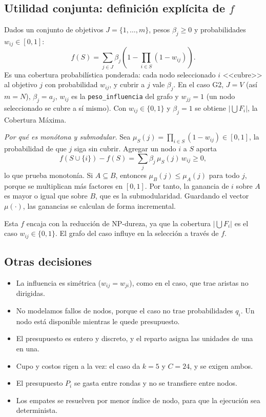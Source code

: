 \documentclass[11pt,a4paper]{article}
\begin{document}
\subsection{Utilidad conjunta: definición explícita de $f$}

Dados un conjunto de objetivos $J=\{1,\dots,m\}$, pesos $\beta_j\ge0$ y
probabilidades $w_{ij}\in[0,1]$:
\[
  f(S)=\sum_{j\in J}\beta_j\left(1-\prod_{i\in S}(1-w_{ij})\right).
\]
Es una cobertura probabilística ponderada: cada nodo seleccionado $i$
<<cubre>> al objetivo $j$ con probabilidad $w_{ij}$, y cubrir a $j$ vale
$\beta_j$. En el caso G2, $J=V$ (así $m=N$), $\beta_j=a_j$, $w_{ij}$ es la
\texttt{peso\_influencia} del grafo y $w_{jj}=1$ (un nodo seleccionado se cubre
a sí mismo). Con $w_{ij}\in\{0,1\}$ y $\beta_j=1$ se obtiene
$\bigl|\bigcup F_i\bigr|$, la Cobertura Máxima.

\emph{Por qué es monótona y submodular.} Sea
$\mu_S(j)=\prod_{i\in S}(1-w_{ij})\in[0,1]$, la probabilidad de que $j$ siga
sin cubrir. Agregar un nodo $i$ a $S$ aporta
\[
  f(S\cup\{i\})-f(S)=\sum_j\beta_j\,\mu_S(j)\,w_{ij}\ge0,
\]
lo que prueba monotonía. Si $A\subseteq B$, entonces $\mu_B(j)\le\mu_A(j)$
para todo $j$, porque se multiplican más factores en $[0,1]$. Por tanto, la
ganancia de $i$ sobre $A$ es mayor o igual que sobre $B$, que es la
submodularidad. Guardando el vector $\mu(\cdot)$, las ganancias se calculan de
forma incremental.

Esta $f$ encaja con la reducción de NP-dureza, ya que la cobertura
$\bigl|\bigcup F_i\bigr|$ es el caso $w_{ij}\in\{0,1\}$. El grafo del caso
influye en la selección a través de $f$.

\subsection{Otras decisiones}

\begin{itemize}[leftmargin=*,label=$\bullet$]
  \item La influencia es simétrica ($w_{ij}=w_{ji}$), como en el caso, que trae
  aristas no dirigidas.
  \item No modelamos fallos de nodos, porque el caso no trae probabilidades
  $q_i$. Un nodo está disponible mientras le quede presupuesto.
  \item El presupuesto es entero y discreto, y el reparto asigna las unidades
  de una en una.
  \item Cupo y costos rigen a la vez: el caso da $k=5$ y $C=24$, y se exigen
  ambos.
  \item El presupuesto $P_i$ se gasta entre rondas y no se transfiere entre
  nodos.
  \item Los empates se resuelven por menor índice de nodo, para que la
  ejecución sea determinista.
\end{itemize}
\end{document}
